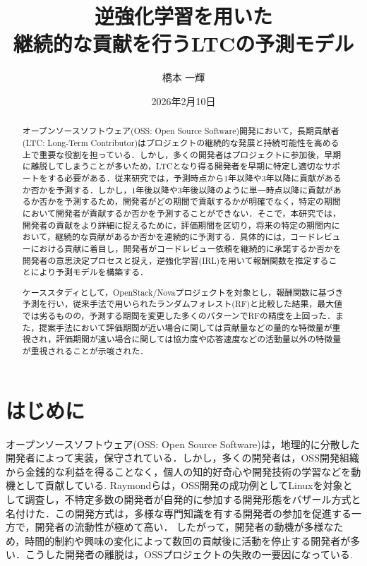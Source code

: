 \documentclass[11pt]{jreport}
\title{逆強化学習を用いた\\
継続的な貢献を行うLTCの予測モデル}
\author{橋本 一輝}
\date{2026年2月10日}	%
\begin{document}
\maketitle

\begin{abstract}
オープンソースソフトウェア(OSS: Open Source Software)開発において，長期貢献者(LTC: Long-Term Contributor)はプロジェクトの継続的な発展と持続可能性を高める上で重要な役割を担っている．しかし，多くの開発者はプロジェクトに参加後，早期に離脱してしまうことが多いため，LTCとなり得る開発者を早期に特定し適切なサポートをする必要がある．従来研究では，予測時点から1年以降や3年以降に貢献があるか否かを予測する．しかし，1年後以降や3年後以降のように単一時点以降に貢献があるか否かを予測するため，開発者がどの期間で貢献するかが明確でなく，特定の期間において開発者が貢献するか否かを予測することができない．そこで，本研究では，開発者の貢献をより詳細に捉えるために，評価期間を区切り，将来の特定の期間内において，継続的な貢献があるか否かを連続的に予測する．具体的には，コードレビューにおける貢献に着目し，開発者がコードレビュー依頼を継続的に承諾するか否かを開発者の意思決定プロセスと捉え，逆強化学習(IRL)を用いて報酬関数を推定することにより予測モデルを構築する．

ケーススタディとして，OpenStack/Novaプロジェクトを対象とし，報酬関数に基づき予測を行い，従来手法で用いられたランダムフォレスト(RF)と比較した結果，最大値では劣るものの，予測する期間を変更した多くのパターンでRFの精度を上回った．また，提案手法において評価期間が近い場合に関しては貢献量などの量的な特徴量が重視され，評価期間が遠い場合に関しては協力度や応答速度などの活動量以外の特徴量が重視されることが示唆された．

\end{abstract}

\tableofcontents



\newpage
{}	%



\chapter{はじめに}
オープンソースソフトウェア(OSS: Open Source Software)は，地理的に分散した開発者によって実装，保守されている．しかし，多くの開発者は，OSS開発組織から金銭的な利益を得ることなく，個人の知的好奇心や開発技術の学習などを動機として貢献している\cite{motivation}.
Raymondらは，OSS開発の成功例としてLinuxを対象として調査し，不特定多数の開発者が自発的に参加する開発形態をバザール方式と名付けた\cite{bazaar}．この開発方式は，多様な専門知識を有する開発者の参加を促進する一方で，開発者の流動性が極めて高い\cite{movement}．
したがって，開発者の動機が多様なため，時間的制約や興味の変化によって数回の貢献後に活動を停止する開発者が多い\cite{OTC}．こうした開発者の離脱は，OSSプロジェクトの失敗の一要因になっている\cite{failed}.
\end{document}
